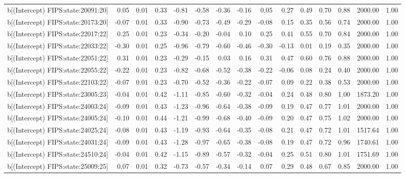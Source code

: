 \begin{table}[ht]
\begin{tabular}{rrrrrrrrrrrrrrr}
  b[(Intercept) FIPS:state:20091:20] & 0.05 & 0.01 & 0.33 & -0.81 & -0.58 & -0.36 & -0.16 & 0.05 & 0.27 & 0.49 & 0.70 & 0.88 & 2000.00 & 1.00 \\ 
  b[(Intercept) FIPS:state:20173:20] & -0.07 & 0.01 & 0.33 & -0.90 & -0.73 & -0.49 & -0.29 & -0.08 & 0.15 & 0.35 & 0.56 & 0.74 & 2000.00 & 1.00 \\ 
  b[(Intercept) FIPS:state:22017:22] & 0.25 & 0.01 & 0.23 & -0.34 & -0.20 & -0.04 & 0.10 & 0.25 & 0.41 & 0.55 & 0.70 & 0.84 & 2000.00 & 1.00 \\ 
  b[(Intercept) FIPS:state:22033:22] & -0.30 & 0.01 & 0.25 & -0.96 & -0.79 & -0.60 & -0.46 & -0.30 & -0.13 & 0.01 & 0.19 & 0.35 & 2000.00 & 1.00 \\ 
  b[(Intercept) FIPS:state:22051:22] & 0.31 & 0.01 & 0.23 & -0.29 & -0.15 & 0.03 & 0.16 & 0.31 & 0.47 & 0.60 & 0.76 & 0.88 & 2000.00 & 1.00 \\ 
  b[(Intercept) FIPS:state:22055:22] & -0.22 & 0.01 & 0.23 & -0.82 & -0.68 & -0.52 & -0.38 & -0.22 & -0.06 & 0.08 & 0.24 & 0.40 & 2000.00 & 1.00 \\ 
  b[(Intercept) FIPS:state:22103:22] & -0.07 & 0.01 & 0.23 & -0.70 & -0.52 & -0.36 & -0.22 & -0.07 & 0.09 & 0.22 & 0.38 & 0.53 & 2000.00 & 1.00 \\ 
  b[(Intercept) FIPS:state:23005:23] & -0.04 & 0.01 & 0.42 & -1.11 & -0.85 & -0.60 & -0.32 & -0.04 & 0.24 & 0.48 & 0.80 & 1.00 & 1873.20 & 1.00 \\ 
  b[(Intercept) FIPS:state:24003:24] & -0.09 & 0.01 & 0.43 & -1.23 & -0.96 & -0.64 & -0.38 & -0.09 & 0.19 & 0.47 & 0.77 & 1.01 & 2000.00 & 1.00 \\ 
  b[(Intercept) FIPS:state:24005:24] & -0.10 & 0.01 & 0.44 & -1.21 & -0.99 & -0.68 & -0.40 & -0.09 & 0.20 & 0.47 & 0.75 & 1.02 & 2000.00 & 1.00 \\ 
  b[(Intercept) FIPS:state:24025:24] & -0.08 & 0.01 & 0.43 & -1.19 & -0.93 & -0.64 & -0.35 & -0.08 & 0.21 & 0.47 & 0.72 & 1.01 & 1517.64 & 1.00 \\ 
  b[(Intercept) FIPS:state:24031:24] & -0.09 & 0.01 & 0.43 & -1.28 & -0.97 & -0.65 & -0.38 & -0.08 & 0.19 & 0.47 & 0.72 & 0.96 & 1740.61 & 1.00 \\ 
  b[(Intercept) FIPS:state:24510:24] & -0.04 & 0.01 & 0.42 & -1.15 & -0.89 & -0.57 & -0.32 & -0.04 & 0.25 & 0.51 & 0.80 & 1.01 & 1751.69 & 1.00 \\ 
  b[(Intercept) FIPS:state:25009:25] & 0.07 & 0.01 & 0.32 & -0.73 & -0.57 & -0.34 & -0.14 & 0.07 & 0.29 & 0.48 & 0.67 & 0.85 & 2000.00 & 1.00 \\ 

\end{tabular}
\end{table}
